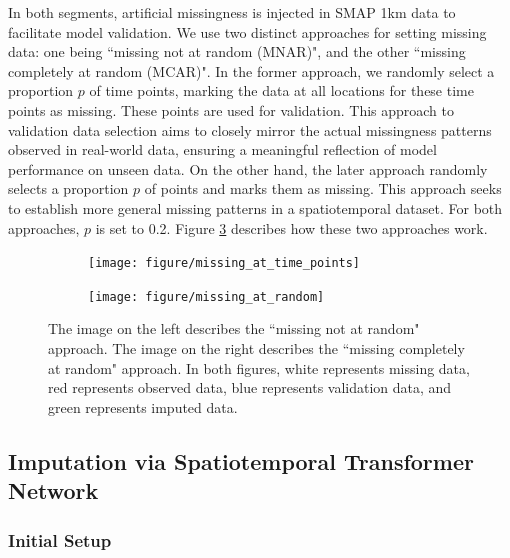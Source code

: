 \documentclass[11pt]{article}
\begin{document}
In both segments, artificial missingness is injected in SMAP 1km data to facilitate model validation.  We use two distinct approaches for setting missing data: one being ``missing not at random (MNAR)", and the other ``missing completely at random (MCAR)". In the former approach, we randomly select a proportion $p$ of time points, marking the data at all locations for these time points as missing. These points are used for validation. This approach to validation data selection aims to closely mirror the actual missingness patterns observed in real-world data, ensuring a meaningful reflection of model performance on unseen data. On the other hand, the later approach randomly selects a proportion $p$ of points and marks them as missing. This approach seeks to establish more general missing patterns in a spatiotemporal dataset. For both approaches, $p$ is set to 0.2. Figure \ref{fig: missing pattern} describes how these two approaches work.



\begin{figure}[H]
     \centering
      \begin{subfigure}[b]{0.45\textwidth}
		\centering
		\texttt{[image: figure/missing\_at\_time\_points]}
		\caption{}
		\label{fig: missing at time points}
	 \end{subfigure}
         \hfill
      \begin{subfigure}[b]{0.45\textwidth}
         \texttt{[image: figure/missing\_at\_random]}
		 \caption{}
	\label{fig: missing at random}
     \end{subfigure}
    
     \caption{The image on the left describes the ``missing not at random" approach. The image on the right describes the ``missing completely at random" approach. In both figures, white represents missing data, red represents observed data, blue represents validation data, and green represents imputed data.}
     \label{fig: missing pattern}
\end{figure}






\subsection{Imputation via Spatiotemporal Transformer Network}\label{sec: Imputation via Spatiotemporal Transformer Network}

\subsubsection*{Initial Setup}\label{sec: Model Training Setup}
\end{document}
